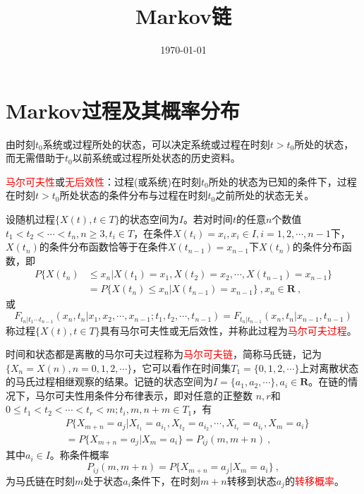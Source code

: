 \documentclass[12pt,a4paper]{article}
\title{Markov链}
\author{}
\date{\today}
\renewcommand{\vec}[1]{\boldsymbol{#1}}
\begin{document}
\maketitle

\section{Markov过程及其概率分布}

由时刻$t_0$系统或过程所处的状态，可以决定系统或过程在时刻$t > t_0$所处的状态，而无需借助于$t_0$以前系统或过程所处状态的历史资料。

\textcolor{red}{马尔可夫性}或\textcolor{red}{无后效性}：过程(或系统)在时刻$t_0$所处的状态为已知的条件下，过程在时刻$t > t_0$所处状态的条件分布与过程在时刻$t_0$之前所处的状态无关。

设随机过程$\{X(t), t\in T \}$的状态空间为$I$。若对时间$t$的任意$n$个数值$t_1 < t_2 < \cdots < t_n, n \geqslant 3, t_i \in T$，在条件$X(t_i) = x_i, x_i \in I, i = 1, 2, \cdots, n -1$下，$X(t_n)$的条件分布函数恰等于在条件$X(t_{n-1}) = x_{n-1}$下$X(t_n)$的条件分布函数，即
\begin{align}
\nonumber P\{X(t_n) &\leqslant x_n | X(t_1) = x_1, X(t_2) = x_2, \cdots, X(t_{n-1}) = x_{n-1} \} \\
& = P\{X(t_n) \leqslant x_n | X(t_{n-1}) = x_{n-1} \} ~, x_n \in \vec{R} ~,
\end{align}
或
\begin{equation*}
F_{t_n|t_1 \cdots t_{n-1}}(x_n, t_n | x_1, x_2, \cdots, x_{n-1}; t_1, t_2, \cdots, t_{n-1}) = F_{t_n|t_{n-1}} (x_n, t_n | x_{n-1}, t_{n-1})
\end{equation*}
称过程$\{X(t), t\in T \}$具有马尔可夫性或无后效性，并称此过程为\textcolor{red}{马尔可夫过程}。

时间和状态都是离散的马尔可夫过程称为\textcolor{red}{马尔可夫链}，简称马氏链，记为$\{X_n = X(n), n = 0, 1, 2, \cdots \}$，它可以看作在时间集$T_1 = \{0, 1, 2, \cdots \}$上对离散状态的马氏过程相继观察的结果。记链的状态空间为$I = \{a_1, a_2, \cdots \}, a_i \in \vec{R}$。在链的情况下，马尔可夫性用条件分布律表示，即对任意的正整数 $n, r$和$0 \leqslant t_1 < t_2 < \cdots < t_r < m; t_i, m , n+m \in T_1$，有
\begin{align}
& P\{X_{m+n} = a_j | X_{t_1} = a_{i_1}, X_{t_2} = a_{i_2}, \cdots, X_{t_r} = a_{i_r}, X_{m} = a_{i} \} \\
& = P\{X_{m+n} = a_j | X_m = a_i \}  = P_{ij}(m, m+n) ~,
\end{align}
其中$a_i \in I$。称条件概率
\begin{equation*}
 P_{ij}(m, m+n) = P\{X_{m+n} = a_j | X_m = a_i \} ~,
\end{equation*}
为马氏链在时刻$m$处于状态$a_i$条件下，在时刻$m+n$转移到状态$a_j$的\textcolor{red}{转移概率}。
\end{document}
